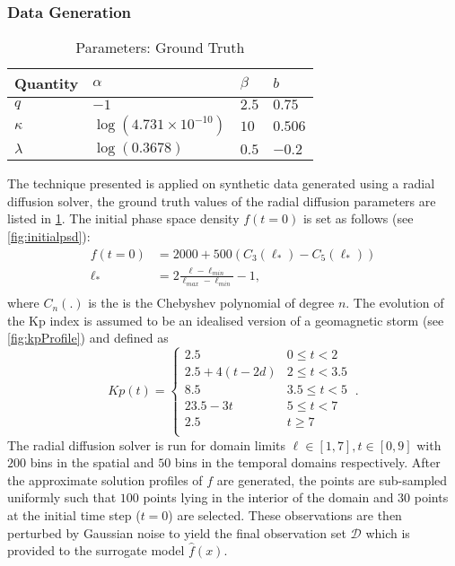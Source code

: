 \subsubsection*{Data Generation}

\begin{table}[t]
  \caption{Parameters: Ground Truth}
  \label{tab:ground-truth}
  \centering
  \begin{tabular}{llll}
    \hline
    \textbf{Quantity}  & $\alpha$ & $\beta$ & $b$ \\
    \hline
    $q$ & $-1$  & $2.5$ & $0.75$  \\
    $\kappa$  & $\log(4.731 \times 10^{-10})$ & $10$ & $0.506$ \\
    $\lambda$ & $\log(0.3678)$ & $0.5$ & $-0.2$ \\
    \hline
  \end{tabular}
\end{table}

The technique presented is applied on synthetic data generated using a radial diffusion solver, 
the ground truth values of the radial diffusion parameters are listed in \cref{tab:ground-truth}.
%
The initial phase space density $f(t = 0)$ is set as follows (see \cref{fig:initialpsd}):
%
\begin{align*}
f(t = 0) &= 2000 + 500(C_{3}(\ell_*) - C_{5}(\ell_*)) \\
\ell_* &= 2\frac{\ell - \ell_{min}}{\ell_{max} - \ell_{min}} - 1 ,\\
\end{align*}
%
where $C_n(.)$ is the is the Chebyshev polynomial of degree $n$. The evolution of the Kp index is 
assumed to be an idealised version of a geomagnetic storm (see \cref{fig:kpProfile}) and 
defined as 
\[
  Kp(t) = \left\{\begin{matrix}
    2.5 & 0 \leq t < 2\\ 
    2.5 + 4(t - 2d) & 2 \leq t < 3.5\\ 
    8.5 & 3.5 \leq  t < 5 \\ 
    23.5 - 3t & 5 \leq t < 7\\
    2.5 & t \geq 7\\ 
    \end{matrix}\right. \ .
\] 
%
The radial diffusion solver is run for domain limits $\ell \in [1, 7], t \in [0, 9]$ with $200$ 
bins in the spatial and $50$ bins in the temporal domains respectively. After the approximate 
solution profiles of $f$ are generated, the points are sub-sampled uniformly such that $100$ points 
lying in the interior of the domain and $30$ points at the initial time step ($t = 0$) are 
selected. These observations are then perturbed by Gaussian noise to yield the final 
observation set $\mathcal{D}$ which is provided to the surrogate model $\hat{f}(x)$.


